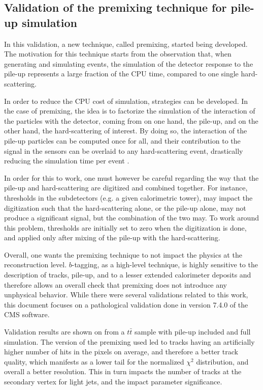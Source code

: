     \subsection{Validation of the premixing technique for pile-up simulation}

    In this validation, a new technique, called premixing, started being developed.
    The motivation for this technique starts from the observation that, when generating and
    simulating events, the simulation of the detector response to the pile-up represents
    a large fraction of the CPU time, compared to one single hard-scattering.

    In order to reduce the CPU cost of simulation, strategies can be developed. In the
    case of premixing, the idea is to factorize the simulation of the interaction of the particles with the
    detector, coming from on one hand, the pile-up, and on the other hand, the hard-scattering
    of interest. By doing so, the interaction of the pile-up particles can be computed once for
    all, and their contribution to the signal in the sensors can be overlaid to any
    hard-scattering event, drastically reducing the simulation time per event \cite{Premixing}.

    In order for this to work, one must however be careful regarding the way that the
    pile-up and hard-scattering are digitized and combined together. For instance,
    thresholds in the subdetectors (e.g. a given calorimetric tower), may
    impact the digitization such that the hard-scattering alone, or the pile-up alone,
    may not produce a significant signal, but the combination of the two may. To
    work around this problem, thresholds are initially set to zero when the digitization
    is done, and applied only after mixing of the pile-up with the hard-scattering.

    Overall, one wants the premixing technique to not impact the physics at the reconstruction
    level. $b$-tagging, as a high-level technique, is highly sensitive to the description
    of tracks, pile-up, and to a lesser extended calorimeter deposits and therefore allows
    an overall check that premixing does not introduce any unphysical behavior. While there
    were several validations related to this work, this document focuses on a pathological
    validation done in version 7.4.0 of the CMS software.

    Validation results are shown on  from
    a $t\bar{t}$ sample with pile-up included and full simulation. The version of the
    premixing used led to tracks having an artificially higher number of hits in the
    pixels on average, and therefore a better track quality, which manifests as a lower
    tail for the normalized $\chi^2$ distribution, and overall a better resolution.
    This in turn impacts the number of tracks at the secondary vertex for light jets, and the
    impact parameter significance.

